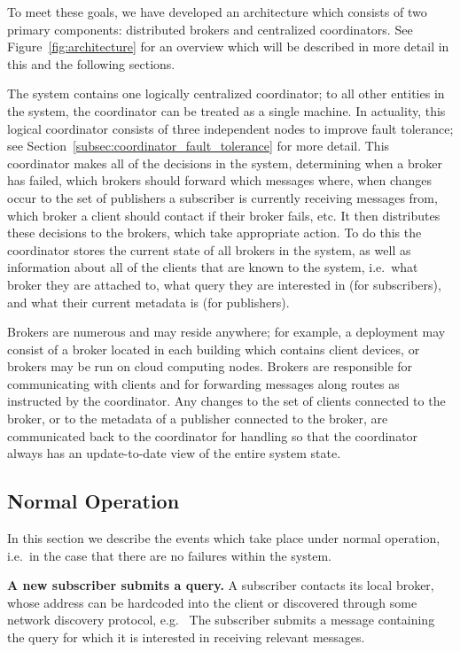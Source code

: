 To meet these goals, we have developed an architecture which consists of two primary components: distributed brokers and centralized coordinators.
See Figure~\ref{fig:architecture} for an overview which will be described in more detail in this and the following sections.

The system contains one logically centralized coordinator; to all other entities in the system, the coordinator can be treated as a single machine.
In actuality, this logical coordinator consists of three independent nodes to improve fault tolerance; see Section~\ref{subsec:coordinator_fault_tolerance} for more detail.
This coordinator makes all of the decisions in the system, determining when a broker has failed, which brokers should forward which messages where, when changes occur to the set of publishers a subscriber is currently receiving messages from, which broker a client should contact if their broker fails, etc.
It then distributes these decisions to the brokers, which take appropriate action.
To do this the coordinator stores the current state of all brokers in the system, as well as information about all of the clients that are known to the system, i.e.\ what broker they are attached to, what query they are interested in (for subscribers), and what their current metadata is (for publishers).

Brokers are numerous and may reside anywhere; for example, a deployment may consist of a broker located in each building which contains client devices, or brokers may be run on cloud computing nodes.
Brokers are responsible for communicating with clients and for forwarding messages along routes as instructed by the coordinator.
Any changes to the set of clients connected to the broker, or to the metadata of a publisher connected to the broker, are communicated back to the coordinator for handling so that the coordinator always has an update-to-date view of the entire system state.

\subsection{Normal Operation}

In this section we describe the events which take place under normal operation, i.e.\ in the case that there are no failures within the system.

\textbf{A new subscriber submits a query.}
A subscriber contacts its local broker, whose address can be hardcoded into the client or discovered through some network discovery protocol, e.g.\ %
The subscriber submits a message containing the query for which it is interested in receiving relevant messages.


